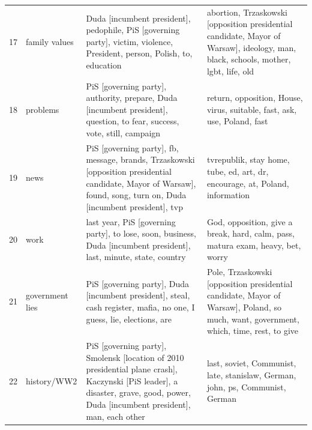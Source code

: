 \documentclass{article}
\begin{document}
\begin{otherlanguage}{polish}
\begin{longtable}{p{2cm}p{2cm}p{5cm}p{5cm}}
	17 &            family values &                                                          Duda [incumbent president], pedophile, PiS [governing party], victim, violence, President, person, Polish, to, education &                                                               abortion, Trzaskowski [opposition presidential candidate, Mayor of Warsaw], ideology, man, black, schools, mother, lgbt, life, old \\
	18 &                 problems &                                                          PiS [governing party], authority, prepare, Duda [incumbent president], question, to fear, success, vote, still, campaign &                                                                                                                         return, opposition, House, virus, suitable, fast, ask, use, Poland, fast \\
	19 &                     news &               PiS [governing party], fb, message, brands, Trzaskowski [opposition presidential candidate, Mayor of Warsaw], found, song, turn on, Duda [incumbent president], tvp &                                                                                                                     tvrepublik, stay home, tube, ed, art, dr, encourage, at, Poland, information \\
	20 &                     work &                                                               last year, PiS [governing party], to lose, soon, business, Duda [incumbent president], last, minute, state, country &                                                                                                                  God, opposition, give a break, hard, calm, pass, matura exam, heavy, bet, worry \\
	21 &          government lies &                                                              PiS [governing party], Duda [incumbent president], steal, cash register, mafia, no one, I guess, lie, elections, are &                                                            Pole, Trzaskowski [opposition presidential candidate, Mayor of Warsaw], Poland, so much, want, government, which, time, rest, to give \\
	22 &              history/WW2 &  PiS [governing party], Smolensk [location of 2010 presidential plane crash], Kaczynski [PiS leader], a disaster, grave, good, power, Duda [incumbent president], man, each other &                                                                                                                    last, soviet, Communist, late, stanislaw, German, john, ps, Communist, German \\

\end{longtable}
\end{otherlanguage}
\end{document}
